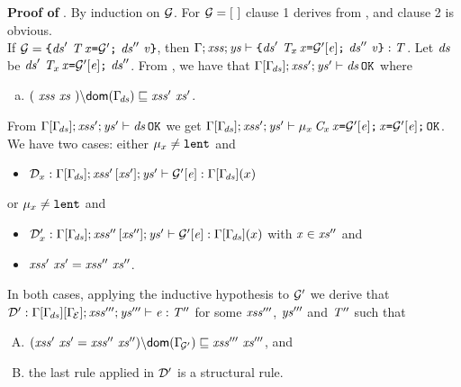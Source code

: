 \noindent
{\bf Proof of }. By induction on ${\cal{G}}$. 
For ${\cal{G}}=[\ ]$ clause 1 derives from , and clause 2 is obvious. \\
If $\genCtx=\Block{\decs'\ \Dec{\T}{\x}{\genCtxP}\ \decs''}{\val}$, then $\TypeCheck{\Gamma}{\LentLocked}{\StronglyLocked}{\Block{\decs'\ \Dec{\T_x}{\x}{\GenCtxP{\e}}\ \decs''}{\val}}{\T}$. Let $\mathit{ds}$ be $\decs'\ \Dec{\T_x}{\x}{\GenCtxP{\e}}\ \decs''$.  From , we have that $\Gamma[\Gamma_{\!\mathit{ds}}];\mathit{xss}';\mathit{ys}'\vdash \mathit{ds}\,{\tt OK}$ where
\begin{enumerate}[(a)]
  \item $\LessEq{(\ \LentLocked\ \xs\ ){\setminus}\dom{\TypeEnv{\decs}}}{\LentLocked'\ \xs'}$.
\end{enumerate}
From $\Gamma[\Gamma_{\!\mathit{ds}}];\mathit{xss}';\mathit{ys}'\vdash \mathit{ds}\,{\tt OK}$ we get 
$\Gamma[\Gamma_{\!\mathit{ds}}];\mathit{xss}';\mathit{ys}'\vdash \mu_x\,\mathit{C}_x\,\mathit{x}\texttt{=}{\cal{G'}}[\mathit{e}]\texttt{;}\,\mathit{x}\texttt{=}{\cal{G'}}[\mathit{e}]\texttt{;}\,{\tt OK}$.\\
We have two cases: either $\mu_x\not=\texttt{lent}$ and
\begin{itemize}
\item ${\cal D}_x:\Gamma[\Gamma_{\!\mathit{ds}}];\mathit{xss}'\,[\mathit{xs}'];\mathit{ys}'\vdash {{\cal{G'}}[\mathit{e}]}:\Gamma[\Gamma_{\!\mathit{ds}}](x)$
\end{itemize}
 or $\mu_x\not=\texttt{lent}$ and
\begin{itemize}
\item ${\cal D}'_x:\Gamma[\Gamma_{\!\mathit{ds}}];\mathit{xss}''\,[\mathit{xs}''];\mathit{ys}'\vdash {{\cal{G'}}[\mathit{e}]}:\Gamma[\Gamma_{\!\mathit{ds}}](x)$ with $\mathit{x}\in\mathit{xs}''$ and 
\item $\LentLocked'\ \xs'=\LentLocked''\ \xs''$.
\end{itemize}
In both cases, applying the inductive hypothesis to ${\cal{G'}}$ we derive that 
${\cal D}':\Gamma[\Gamma_{\!\mathit{ds}}][\Gamma_{\!{\cal{E}}}];\mathit{xss}''';\mathit{ys}'''\vdash {\mathit{e}}:\mathit{T}''$ for some
$\mathit{xss}'''$, $\mathit{ys}'''$ and $\mathit{T}''$ such that 
\begin{enumerate} [(A)]
  \item $\LessEq{(\LentLocked'\ \xs'=\LentLocked''\ \xs''){\setminus}\dom{\TypeEnv{\genCtxP}}}{\LentLocked'''\ \xs'''}$, and
  \item the last rule applied in ${\cal D}'$ is a structural rule.
\end{enumerate}
